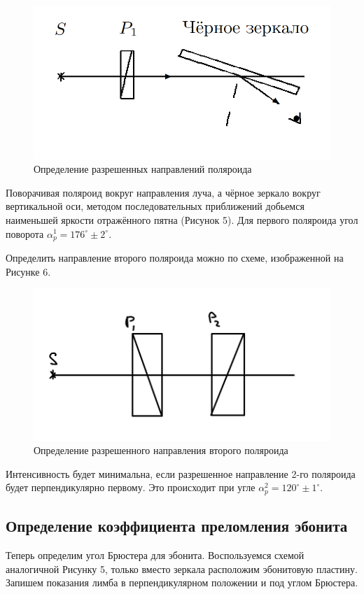 \documentclass[a4paper,12pt]{article}
\begin{document}
\begin{figure}[h!]
    \centering
    \includegraphics[scale = 0.6]{5.png}
    \caption{Определение разрешенных направлений поляроида}
    \label{fig : 1}
\end{figure}
Поворачивая поляроид вокруг направления луча, а чёрное зеркало вокруг вертикальной оси, методом последовательных приближений добьемся
наименьшей яркости отражённого пятна (Рисунок 5). Для первого поляроида угол поворота $\alpha_p^1 = 176^\circ\pm2^\circ$.

Определить направление второго поляроида можно по схеме, изображенной на Рисунке 6. 


\begin{figure}[h!]
    \centering
    \includegraphics[scale = 0.8]{9.png}
    \caption{Определение разрешенного  направления второго поляроида}
    \label{fig : 1}
\end{figure}

Интенсивность будет минимальна, если разрешенное направление 2-го поляроида будет перпендикулярно первому. Это происходит при угле $\alpha_p^2=120^\circ\pm1^\circ$.

\subsection{Определение коэффициента преломления эбонита}
Теперь определим угол Брюстера для эбонита. Воспользуемся схемой аналогичной Рисунку 5, только вместо зеркала расположим эбонитовую пластину. Запишем показания лимба в перпендикулярном положении и под углом Брюстера.
\end{document}
